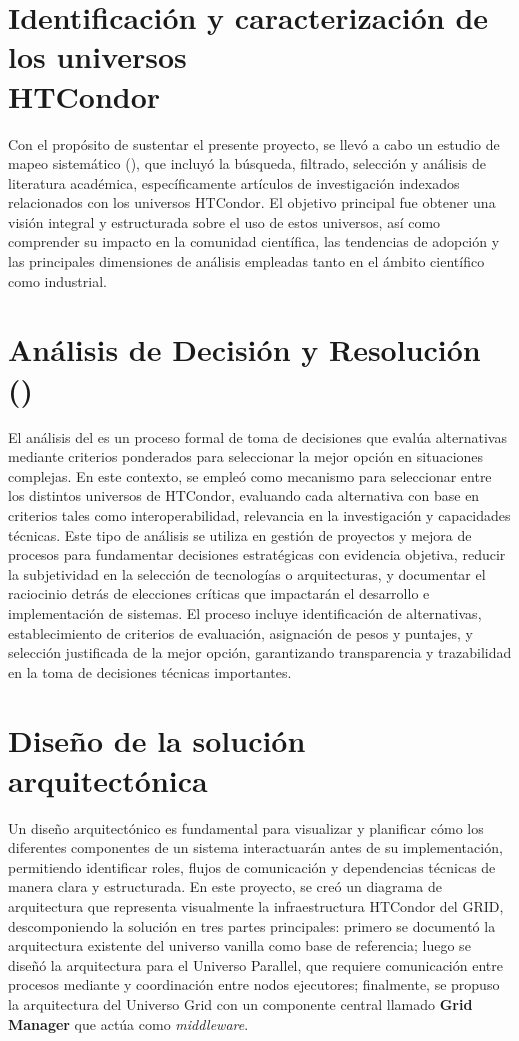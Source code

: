 \section{Identificación y caracterización de los universos\\HTCondor}
\noindent
Con el propósito de sustentar el presente proyecto, se llevó a cabo un estudio de mapeo sistemático (\SMS), que incluyó la búsqueda, filtrado, selección y análisis de literatura académica, específicamente artículos de investigación indexados relacionados con los universos HTCondor. El objetivo principal fue obtener una visión integral y estructurada sobre el uso de estos universos, así como comprender su impacto en la comunidad científica, las tendencias de adopción y las principales dimensiones de análisis empleadas tanto en el ámbito científico como industrial.


\section{Análisis de Decisión y Resolución (\DAR)}
\noindent
El análisis \DAR del \CMMI es un proceso formal de toma de decisiones que evalúa alternativas mediante criterios ponderados para seleccionar la mejor opción en situaciones complejas. En este contexto, se empleó como mecanismo para seleccionar entre los distintos universos de HTCondor, evaluando cada alternativa con base en criterios tales como interoperabilidad, relevancia en la investigación y capacidades técnicas. Este tipo de análisis \DAR se utiliza en gestión de proyectos y mejora de procesos para fundamentar decisiones estratégicas con evidencia objetiva, reducir la subjetividad en la selección de tecnologías o arquitecturas, y documentar el raciocinio detrás de elecciones críticas que impactarán el desarrollo e implementación de sistemas. El proceso incluye identificación de alternativas, establecimiento de criterios de evaluación, asignación de pesos y puntajes, y selección justificada de la mejor opción, garantizando transparencia y trazabilidad en la toma de decisiones técnicas importantes.


\section{Diseño de la solución arquitectónica}
\noindent
Un diseño arquitectónico es fundamental para visualizar y planificar cómo los diferentes componentes de un sistema interactuarán antes de su implementación, permitiendo identificar roles, flujos de comunicación y dependencias técnicas de manera clara y estructurada. En este proyecto, se creó un diagrama de arquitectura que representa visualmente la infraestructura HTCondor del GRID, descomponiendo la solución en tres partes principales: primero se documentó la arquitectura existente del universo vanilla como base de referencia; luego se diseñó la arquitectura para el Universo Parallel, que requiere comunicación entre procesos mediante \MPI y coordinación entre nodos ejecutores; finalmente, se propuso la arquitectura del Universo Grid con un componente central llamado \textbf{Grid Manager} que actúa como \textit{middleware}.

